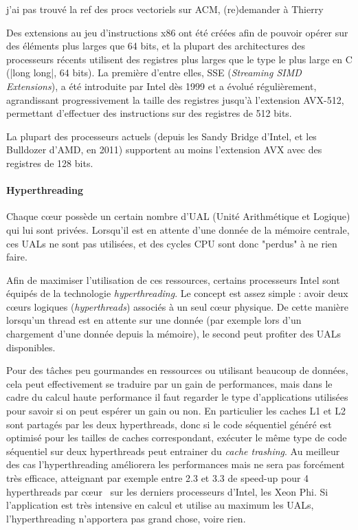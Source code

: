 \begin{todo}
  j'ai pas trouvé la ref des procs vectoriels sur ACM, (re)demander à Thierry
\end{todo}

Des extensions au jeu d'instructions x86 ont été créées afin de pouvoir opérer sur des éléments plus larges que 64 bits, et la plupart des architectures des processeurs récents utilisent des registres plus larges que le type le plus large en C (|long long|, 64 bits).
La première d'entre elles, SSE (\emph{Streaming SIMD Extensions}), a été introduite par Intel dès 1999 et a évolué régulièrement, agrandissant progressivement la taille des registres jusqu'à l'extension AVX-512, permettant d'effectuer des instructions sur des registres de 512 bits.

La plupart des processeurs actuels (depuis les Sandy Bridge d'Intel, et les Bulldozer d'AMD, en 2011) supportent au moins l'extension AVX avec des registres de 128 bits.

\paragraph{Hyperthreading}

Chaque cœur possède un certain nombre d'UAL (Unité Arithmétique et Logique) qui lui sont privées. Lorsqu'il est en attente d'une donnée de la mémoire centrale, ces UALs ne sont pas utilisées, et des cycles CPU sont donc "perdus" à ne rien faire.

Afin de maximiser l'utilisation de ces ressources, certains processeurs Intel sont équipés de la technologie \emph{hyperthreading}.
Le concept est assez simple : avoir deux cœurs logiques (\emph{hyperthreads}) associés à un seul cœur physique.
De cette manière lorsqu'un thread est en attente sur une donnée (par exemple lors d'un chargement d'une donnée depuis la mémoire), le second peut profiter des UALs disponibles.

Pour des tâches peu gourmandes en ressources ou utilisant beaucoup de données, cela peut effectivement se traduire par un gain de performances, mais dans le cadre du calcul haute performance il faut regarder le type d'applications utilisées pour savoir si on peut espérer un gain ou non.
En particulier les caches L1 et L2 sont partagés par les deux hyperthreads, donc si le code séquentiel généré est optimisé pour les tailles de caches correspondant, exécuter le même type de code séquentiel sur deux hyperthreads peut entrainer du \emph{cache trashing}.
Au meilleur des cas l'hyperthreading améliorera les performances mais ne sera pas forcément très efficace, atteignant par exemple entre 2.3 et 3.3 de speed-up pour 4 hyperthreads par cœur~\cite{Jeffers2016} sur les derniers processeurs d'Intel, les Xeon Phi.
Si l'application est très intensive en calcul et utilise au maximum les UALs, l'hyperthreading n'apportera pas grand chose, voire rien.

